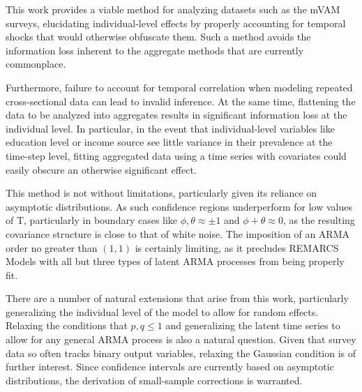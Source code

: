     This work provides a viable method for analyzing datasets such as the mVAM surveys, elucidating individual-level effects by properly accounting for temporal shocks that would otherwise obfuscate them. Such a method avoids the information loss inherent to the aggregate methods that are currently commonplace.



Furthermore, failure to account for temporal correlation when modeling repeated cross-sectional data can lead to invalid inference. At the same time, flattening the data to be analyzed into aggregates results in significant information loss at the individual level. In particular, in the event that individual-level variables like education level or income source see little variance in their prevalence at the time-step level, fitting aggregated data using a time series with covariates could easily obscure an otherwise significant effect.

    This method is not without limitations, particularly given its reliance on asymptotic distributions. As such confidence regions underperform for low values of T, particularly in boundary cases like $\phi,\theta \approx \pm1$ and $\phi + \theta \approx 0$, as the resulting covariance structure is close to that of white noise. The imposition of an ARMA order no greater than $(1,1)$ is certainly limiting, as it precludes REMARCS Models with all but three types of latent ARMA processes from being properly fit.  

    There are a number of natural extensions that arise from this work, particularly generalizing the individual level of the model to allow for random effects. Relaxing the conditions that $p,q\leq1$ and generalizing the latent time series to allow for any general ARMA process is also a natural question. Given that survey data so often tracks binary output variables, relaxing the Gaussian condition is of further interest. Since confidence intervals are currently based on asymptotic distributions, the derivation of small-sample corrections is warranted.
